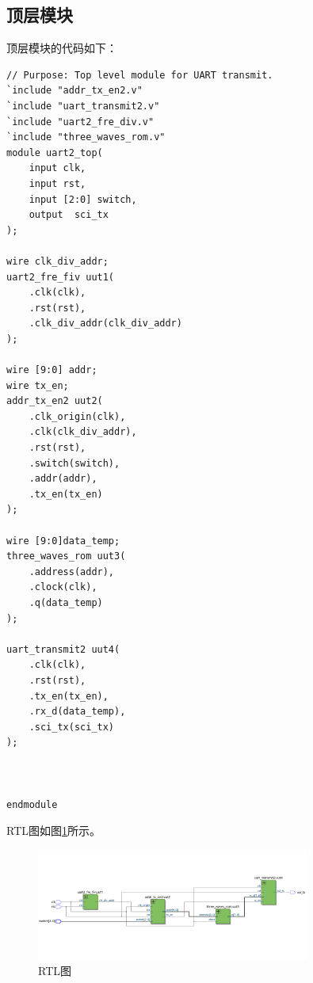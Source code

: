 \documentclass[UTF8]{ctexart}
\begin{document}
\subsection{顶层模块}
顶层模块的代码如下：
\begin{framed}
    \begin{lstlisting}[style=verilogStyle]
// Purpose: Top level module for UART transmit.
`include "addr_tx_en2.v"
`include "uart_transmit2.v"
`include "uart2_fre_div.v"
`include "three_waves_rom.v"
module uart2_top(
    input clk,
    input rst,
    input [2:0] switch,
    output  sci_tx
);

wire clk_div_addr;
uart2_fre_fiv uut1(
    .clk(clk),
    .rst(rst),
    .clk_div_addr(clk_div_addr)
);

wire [9:0] addr;
wire tx_en;
addr_tx_en2 uut2(
    .clk_origin(clk),
    .clk(clk_div_addr),
    .rst(rst),
    .switch(switch),
    .addr(addr),
    .tx_en(tx_en)
);

wire [9:0]data_temp;
three_waves_rom uut3(
    .address(addr),
    .clock(clk),
    .q(data_temp)
);

uart_transmit2 uut4(
    .clk(clk),
    .rst(rst),
    .tx_en(tx_en),
    .rx_d(data_temp),
    .sci_tx(sci_tx)
);



endmodule
    \end{lstlisting}
\end{framed}
RTL图如图\ref{fig:rtl}所示。
\begin{figure}[!ht]
    \centering
    \includegraphics[width=0.8\textwidth]{rtl1.png}
    \caption{RTL图}
    \label{fig:rtl}
\end{figure}
\end{document}
